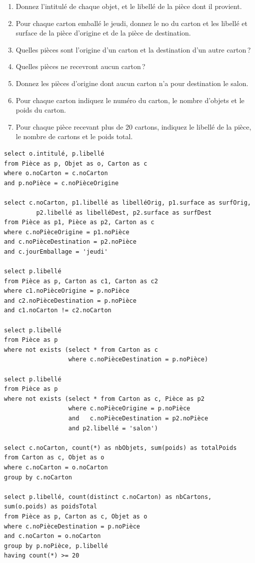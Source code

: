 \begin{enumerate}
  \item Donnez l'intitulé de chaque objet, et le libellé de la pièce
    dont il provient.

  \item Pour chaque carton emballé le jeudi, donnez le no du carton et les libellé et surface
      de la pièce d'origine et de la pièce de destination.
  \item Quelles pièces sont l'origine d'un carton et la destination d'un autre carton\,?
  \item Quelles pièces ne recevront aucun carton\,?
  \item Donnez les pièces d'origine dont aucun carton n'a pour destination le salon.
  \item Pour chaque carton indiquez le numéro du carton, le nombre d'objets et le poids du carton.
  \item Pour chaque pièce recevant plus de 20 cartons, indiquez le libellé de la pièce, le
    nombre de cartons et le poids total.
  \end{enumerate}


\begin{solution}

\begin{verbatim}
select o.intitulé, p.libellé
from Pièce as p, Objet as o, Carton as c
where o.noCarton = c.noCarton
and p.noPièce = c.noPièceOrigine

select c.noCarton, p1.libellé as libelléOrig, p1.surface as surfOrig,
         p2.libellé as libelléDest, p2.surface as surfDest
from Pièce as p1, Pièce as p2, Carton as c
where c.noPièceOrigine = p1.noPièce
and c.noPièceDestination = p2.noPièce
and c.jourEmballage = 'jeudi'

select p.libellé
from Pièce as p, Carton as c1, Carton as c2
where c1.noPièceOrigine = p.noPièce
and c2.noPièceDestination = p.noPièce
and c1.noCarton != c2.noCarton

select p.libellé
from Pièce as p
where not exists (select * from Carton as c
                  where c.noPièceDestination = p.noPièce)

select p.libellé
from Pièce as p
where not exists (select * from Carton as c, Pièce as p2
                  where c.noPièceOrigine = p.noPièce
                  and   c.noPièceDestination = p2.noPièce
                  and p2.libellé = 'salon')

select c.noCarton, count(*) as nbObjets, sum(poids) as totalPoids
from Carton as c, Objet as o
where c.noCarton = o.noCarton
group by c.noCarton

select p.libellé, count(distinct c.noCarton) as nbCartons, sum(o.poids) as poidsTotal
from Pièce as p, Carton as c, Objet as o
where c.noPièceDestination = p.noPièce
and c.noCarton = o.noCarton
group by p.noPièce, p.libellé
having count(*) >= 20
\end{verbatim}
\end{solution}


